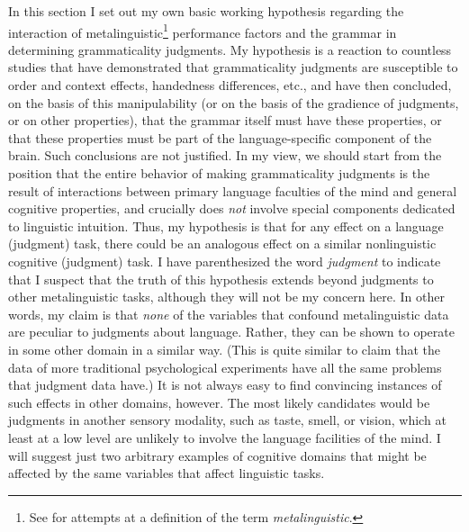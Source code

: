 In this section I set out my own basic working hypothesis regarding the interaction of metalinguistic\footnote{See  for attempts at a definition of the term \textit{metalinguistic}.} performance factors and the grammar in determining grammaticality judgments. My hypothesis is a reaction to countless studies that have demonstrated that grammaticality judgments are susceptible to order and context effects, handedness differences, etc., and have then concluded, on the basis of this manipulability (or on the basis of the gradience of judgments, or on other properties), that the grammar itself must have these properties, or that these properties must be part of the language-specific component of the brain. Such conclusions are not justified. In my view, we should start from the position that the entire behavior of making grammaticality judgments is the result of interactions between primary language faculties of the mind and general cognitive properties, and crucially does \textit{not} involve special components dedicated to linguistic intuition. Thus, my hypothesis is that for any effect on a language (judgment) task, there could be an analogous effect on a similar nonlinguistic cognitive (judgment) task. I have parenthesized the word \textit{judgment} to indicate that I suspect that the truth of this hypothesis extends beyond judgments to other metalinguistic tasks, although they will not be my concern here. In other words, my claim is that \textit{none} of the variables that confound metalinguistic data are peculiar to judgments about language. Rather, they can be shown to operate in some other domain in a similar way. (This is quite similar to  claim that the data of more traditional psychological experiments have all the same problems that judgment data have.) It is not always easy to find convincing instances of such effects in other domains, however. The most likely candidates would be judgments in another sensory modality, such as taste, smell, or vision, which at least at a low level are unlikely to involve the language facilities of the mind. I will suggest just two arbitrary examples of cognitive domains that might be affected by the same variables that affect linguistic tasks.

